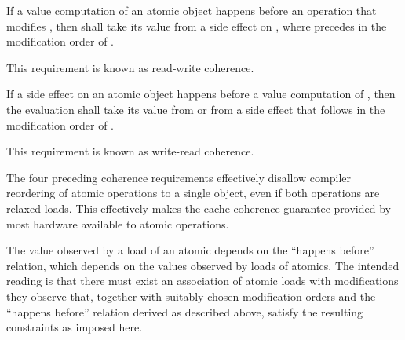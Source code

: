 \pnum
{}%
If a
%
value computation  of an atomic object  happens before an
operation  that modifies , then  shall take its value from a side
effect  on , where  precedes  in the
modification order of . \begin{note} This requirement is known as
read-write coherence. \end{note}

\pnum
{}%
If a
%
side effect  on an atomic object  happens before a value
computation  of , then the evaluation  shall take its
value from  or from a
%
side effect  that follows  in the
modification order of . \begin{note} This requirement is known as
write-read coherence. \end{note}

\pnum
\begin{note} The four preceding coherence requirements effectively disallow
compiler reordering of atomic operations to a single object, even if both
operations are relaxed loads. This effectively makes the cache coherence
guarantee provided by most hardware available to \Cpp{} atomic operations.
\end{note}

\pnum
\begin{note} The value observed by a load of an atomic depends on the ``happens
before'' relation, which depends on the values observed by loads of atomics.
The intended reading is that there must exist an
association of atomic loads with modifications they observe that, together with
suitably chosen modification orders and the ``happens before'' relation derived
as described above, satisfy the resulting constraints as imposed here. \end{note}

